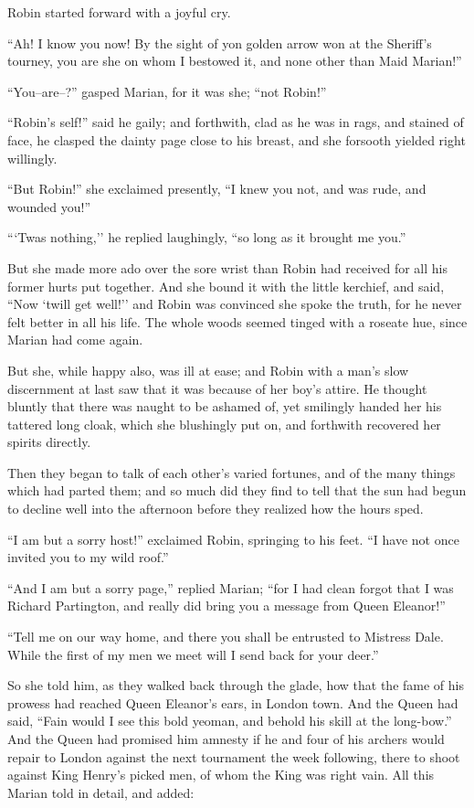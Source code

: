 Robin started forward with a joyful cry.

``Ah! I know you now! By the sight of yon golden arrow won at the
Sheriff's tourney, you are she on whom I bestowed it, and none other
than Maid Marian!''

``You--are--?'' gasped Marian, for it was she; ``not Robin!''

``Robin's self!'' said he gaily; and forthwith, clad as he was in rags,
and stained of face, he clasped the dainty page close to his breast, and
she forsooth yielded right willingly.

``But Robin!'' she exclaimed presently, ``I knew you not, and was rude,
and wounded you!''

```Twas nothing,'' he replied laughingly, ``so long as it brought me
you.''

But she made more ado over the sore wrist than Robin had received for
all his former hurts put together. And she bound it with the little
kerchief, and said, ``Now `twill get well!'' and Robin was convinced she
spoke the truth, for he never felt better in all his life. The whole
woods seemed tinged with a roseate hue, since Marian had come again.

But she, while happy also, was ill at ease; and Robin with a man's slow
discernment at last saw that it was because of her boy's attire. He
thought bluntly that there was naught to be ashamed of, yet smilingly
handed her his tattered long cloak, which she blushingly put on, and
forthwith recovered her spirits directly.

Then they began to talk of each other's varied fortunes, and of the many
things which had parted them; and so much did they find to tell that the
sun had begun to decline well into the afternoon before they realized
how the hours sped.

``I am but a sorry host!'' exclaimed Robin, springing to his feet. ``I
have not once invited you to my wild roof.''

``And I am but a sorry page,'' replied Marian; ``for I had clean forgot
that I was Richard Partington, and really did bring you a message from
Queen Eleanor!''

``Tell me on our way home, and there you shall be entrusted to Mistress
Dale. While the first of my men we meet will I send back for your
deer.''

So she told him, as they walked back through the glade, how that the
fame of his prowess had reached Queen Eleanor's ears, in London town.
And the Queen had said, ``Fain would I see this bold yeoman, and behold
his skill at the long-bow.'' And the Queen had promised him amnesty if
he and four of his archers would repair to London against the next
tournament the week following, there to shoot against King Henry's
picked men, of whom the King was right vain. All this Marian told in
detail, and added:

